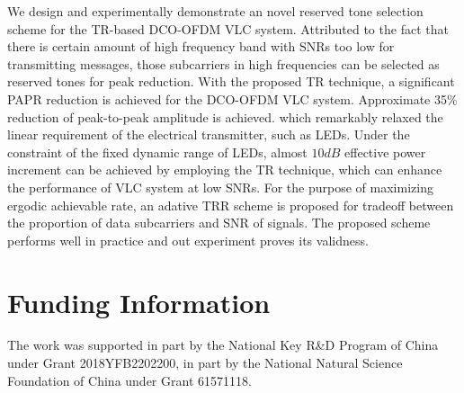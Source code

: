 \documentclass[9pt,twocolumn,twoside]{osajnl}
\begin{document}
We design and experimentally demonstrate an novel reserved tone selection scheme for the TR-based DCO-OFDM VLC system. Attributed to the fact that there is certain amount of high frequency band with SNRs 
too low for transmitting messages, those subcarriers in high frequencies can be selected as reserved tones 
for peak reduction. With the proposed TR technique, a significant PAPR reduction is achieved for the DCO-OFDM VLC system. Approximate 35\% reduction of peak-to-peak amplitude is achieved. which 
remarkably relaxed the linear requirement of the electrical transmitter, such as LEDs. Under the constraint 
of the fixed dynamic range of LEDs, almost $10dB$ effective power increment can be achieved by employing the TR technique, which can enhance the performance of VLC system at low SNRs. 
For the purpose of maximizing ergodic achievable rate, an adative TRR scheme is proposed for tradeoff 
between the proportion of data subcarriers and SNR of signals. The proposed scheme performs well in practice and out experiment proves its validness.

\section{Funding Information}

The work  was supported in part by the National Key R\&D Program of China under Grant 2018YFB2202200, in part by the National Natural Science Foundation of China under Grant 61571118.



\nocite{1}
\nocite{*}

\end{document}
